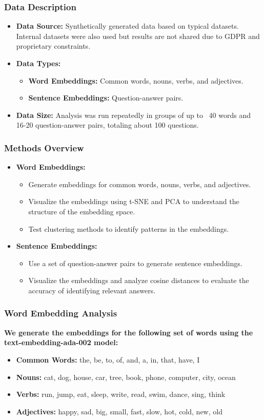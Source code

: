 \documentclass{beamer}
\begin{document}
\begin{frame}
\frametitle{Data Description}
\begin{itemize}
    \item \textbf{Data Source:} Synthetically generated data based on typical datasets. Internal datasets were also used but results are not shared due to GDPR and proprietary constraints.
    \item \textbf{Data Types:} 
    \begin{itemize}
        \item \textbf{Word Embeddings:} Common words, nouns, verbs, and adjectives.
        \item \textbf{Sentence Embeddings:} Question-answer pairs.
    \end{itemize}
    \item \textbf{Data Size:} Analysis was run repeatedly in groups of up to ~40 words and 16-20 question-answer pairs, totaling about 100 questions.
\end{itemize}
\end{frame}

\begin{frame}
\frametitle{Methods Overview}
\begin{itemize}
    \item \textbf{Word Embeddings:}
    \begin{itemize}
        \item Generate embeddings for common words, nouns, verbs, and adjectives.
        \item Visualize the embeddings using t-SNE and PCA to understand the structure of the embedding space.
        \item Test clustering methods to identify patterns in the embeddings.
    \end{itemize}
    \item \textbf{Sentence Embeddings:}
    \begin{itemize}
        \item Use a set of question-answer pairs to generate sentence embeddings.
        \item Visualize the embeddings and analyze cosine distances to evaluate the accuracy of identifying relevant answers.
    \end{itemize}
\end{itemize}
\end{frame}

\begin{frame}
\frametitle{Word Embedding Analysis}
\textbf{We generate the embeddings for the following set of words using the text-embedding-ada-002 model:}
\begin{itemize}
    \item \textbf{Common Words:} the, be, to, of, and, a, in, that, have, I
    \item \textbf{Nouns:} cat, dog, house, car, tree, book, phone, computer, city, ocean
    \item \textbf{Verbs:} run, jump, eat, sleep, write, read, swim, dance, sing, think
    \item \textbf{Adjectives:} happy, sad, big, small, fast, slow, hot, cold, new, old
\end{itemize}
\end{frame}
\end{document}
